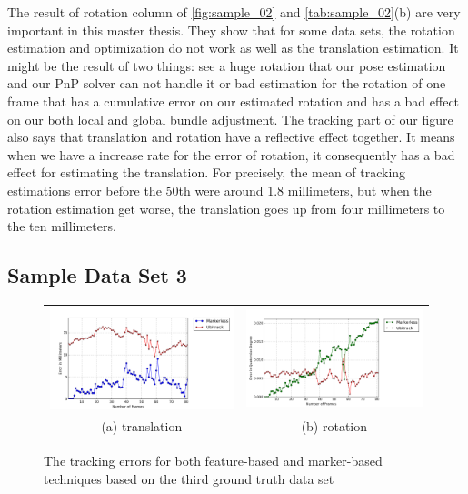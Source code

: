 The result of rotation column of \autoref{fig:sample_02} and \autoref{tab:sample_02}(b) are very important in this master thesis. They show that for some data sets, the rotation estimation and optimization do not work as well as the translation estimation. It might be the result of two things: see a huge rotation that our pose estimation and our PnP solver can not handle it or bad estimation for the rotation of one frame that has a cumulative error on our estimated rotation and has a bad effect on our both local and global bundle adjustment. The tracking part of our figure also says that translation and rotation have a reflective effect together. It means when we have a increase rate for the error of rotation, it consequently has a bad effect for estimating the translation. For precisely, the mean of tracking estimations error before the 50th were around 1.8 millimeters, but when the rotation estimation get worse, the translation goes up from four millimeters to the ten millimeters.


\subsection{Sample Data Set 3}
\begin{figure}[H]
\begin{tabular}{cc}
  \includegraphics[width=80mm]{figures/frame_600/graph_translation} &  \includegraphics[width=80mm]{figures/frame_600/graph_rotation} \\
(a) translation & (b) rotation \\[6pt]
\end{tabular}
\caption{The tracking errors for both feature-based and marker-based techniques based on the third ground truth data set}\label{fig:sample_03}
\end{figure}

